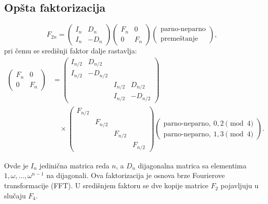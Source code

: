 \documentclass[12pt,a4paper]{report}
\begin{document}
\subsection{Opšta faktorizacija}

\begin{equation}
	F_{2n} =
	\begin{pmatrix}
		I_n & D_n \\
		I_n & -D_n
	\end{pmatrix}
	\begin{pmatrix}
		F_n & 0 \\
		0   & F_n
	\end{pmatrix}
	\begin{pmatrix}
		\text{parno-neparno} \\
		\text{premeštanje}
	\end{pmatrix},
\end{equation}
pri čemu se središnji faktor dalje rastavlja:
\begin{equation}
	\begin{split}
		\begin{pmatrix}
			F_n & 0 \\
			0   & F_n
		\end{pmatrix}
		&= \begin{pmatrix}
			I_{n/2} & D_{n/2} & & \\
			I_{n/2} & -D_{n/2} & & \\
			& & I_{n/2} & D_{n/2} \\
			& & I_{n/2} & -D_{n/2}
		\end{pmatrix} \\
		&\quad \times \begin{pmatrix}
			F_{n/2} & & & \\
			& F_{n/2} & & \\
			& & F_{n/2} & \\
			& & & F_{n/2}
		\end{pmatrix}
		\begin{pmatrix}
			\text{parno-neparno},\ 0,2 \pmod 4 \\
			\text{parno-neparno},\ 1,3 \pmod 4
		\end{pmatrix}.
	\end{split}
\end{equation}

Ovde je $I_n$ jedinična matrica reda $n$, a $D_n$ dijagonalna matrica sa
elementima $1, \omega, \dots, \omega^{n-1}$ na dijagonali. Ova faktorizacija
je osnova brze Fourierove transformacije (FFT). U središnjem faktoru se
dve kopije matrice $F_2$ pojavljuju u slučaju $F_4$.
\end{document}
